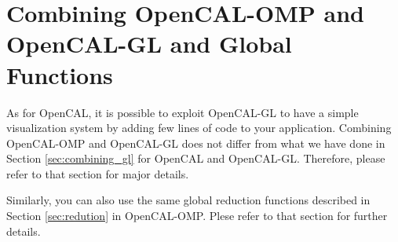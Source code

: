 \section{Combining OpenCAL-OMP and OpenCAL-GL and Global Functions}

As for OpenCAL, it is possible to exploit OpenCAL-GL to have a simple
visualization system by adding few lines of code to your
application. Combining OpenCAL-OMP and OpenCAL-GL does not differ from
what we have done in Section \ref{sec:combining_gl} for OpenCAL and
OpenCAL-GL. Therefore, please refer to that section for major details.

Similarly, you can also use the same global reduction functions
described in Section \ref{sec:redution} in OpenCAL-OMP. Plese refer to
that section for further details.
